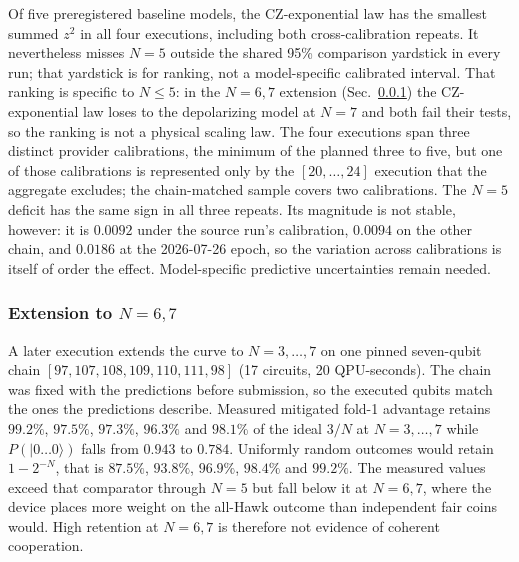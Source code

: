 \documentclass[conference,letterpaper,10pt]{IEEEtran}
\newcommand{\ket}[1]{\ensuremath{|#1\rangle}}
\begin{document}
Of five preregistered baseline models, the CZ-exponential law has the
smallest summed $z^2$ in all four executions, including both
cross-calibration repeats. It nevertheless
misses $N=5$ outside the shared 95\% comparison yardstick in every run; that
yardstick is for ranking, not a model-specific calibrated interval.
That ranking is specific to $N\le 5$: in the $N=6,7$ extension
(Sec.~\ref{sec:n67}) the CZ-exponential law loses to the depolarizing model at
$N=7$ and both fail their tests, so the ranking is not a physical scaling law.
The four executions span three distinct provider calibrations, the minimum
of the planned three to five, but one of those calibrations is
represented only by the $[20,\ldots,24]$ execution that the aggregate
excludes; the chain-matched sample covers two calibrations. The $N=5$ deficit
has the same sign in all three repeats. Its magnitude is not stable, however:
it is $0.0092$ under the source run's calibration, $0.0094$ on the other
chain, and $0.0186$ at the 2026-07-26 epoch, so the variation across
calibrations is itself of order the effect. Model-specific predictive
uncertainties remain needed.

\subsubsection{Extension to \texorpdfstring{$N=6,7$}{N=6,7}}\label{sec:n67}
A later execution extends the curve to $N=3,\ldots,7$ on one pinned seven-qubit
chain $[97,107,108,109,110,111,98]$ (17 circuits, 20 QPU-seconds). The chain
was fixed with the predictions before submission, so the executed qubits match
the ones the predictions describe. Measured mitigated fold-1
advantage retains $99.2\%$, $97.5\%$, $97.3\%$, $96.3\%$ and $98.1\%$ of the
ideal $3/N$ at $N=3,\ldots,7$ while $P(\ket{0\ldots0})$ falls from $0.943$ to
$0.784$. Uniformly random outcomes would retain $1-2^{-N}$, that is
$87.5\%$, $93.8\%$, $96.9\%$, $98.4\%$ and $99.2\%$. The measured values
exceed that comparator through $N=5$ but fall below it at $N=6,7$, where the
device places more weight on the all-Hawk outcome than independent fair coins
would. High retention at $N=6,7$ is therefore not evidence of coherent
cooperation.
\end{document}
